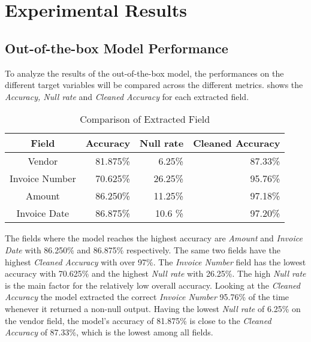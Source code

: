 \chapter{Experimental Results}

\section{Out-of-the-box Model Performance}

To analyze the results of the out-of-the-box model, the performances on the different target variables will be compared across the different metrics.  shows the \textit{Accuracy, Null rate} and \textit{Cleaned Accuracy} for each extracted field. 

\begin{table}[ht]   %
    \centering
    \footnotesize
    \begin{tabular}{c|rrr} %
        \toprule    %
        Field  & Accuracy  & Null rate & Cleaned Accuracy \\
        \midrule    %
        Vendor           & 81.875\%   &  6.25\%   & 87.33\% \\
        Invoice Number   & 70.625\%   & 26.25\%  & 95.76\%\\
        Amount           & 86.250\%   & 11.25\%  & 97.18\% \\
        Invoice Date     & 86.875\%   & 10.6 \%  & 97.20\% \\
        \bottomrule %
    \end{tabular}
    \caption{Comparison of Extracted Field}
    \label{table:Field_Com}
\end{table}

The fields where the model reaches the highest accuracy are \textit{Amount} and \textit{Invoice Date} with 86.250\% and 86.875\% respectively. The same two fields have the highest \textit{Cleaned Accuracy} with over 97\%. The \textit{Invoice Number} field has the lowest accuracy with 70.625\% and the highest \textit{Null rate} with 26.25\%. The high \textit{Null rate} is the main factor for the relatively low overall accuracy. Looking at the \textit{Cleaned Accuracy} the model extracted the correct \textit{Invoice Number} 95.76\% of the time whenever it returned a non-null output. Having the lowest \textit{Null rate} of 6.25\% on the vendor field, the model's accuracy of 81.875\% is close to the \textit{Cleaned Accuracy} of 87.33\%, which is the lowest among all fields. 

